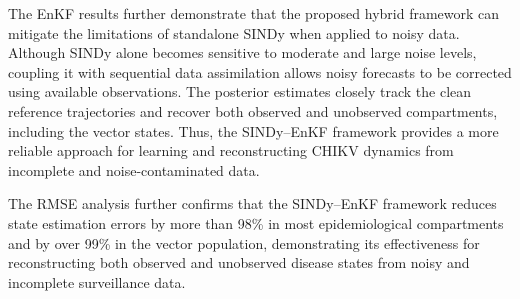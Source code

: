 \documentclass[9pt]{article}
\numberwithin{equation}{section}
\begin{document}
The EnKF results further demonstrate that the proposed hybrid framework can mitigate the limitations of standalone SINDy when applied to noisy data. Although SINDy alone becomes sensitive to moderate and large noise levels, coupling it with sequential data assimilation allows noisy forecasts to be corrected using available observations. The posterior estimates closely track the clean reference trajectories and recover both observed and unobserved compartments, including the vector states. Thus, the SINDy--EnKF framework provides a more reliable approach for learning and reconstructing CHIKV dynamics from incomplete and noise-contaminated data.

The RMSE analysis further confirms that the SINDy--EnKF framework reduces state estimation errors by more than 98\% in most epidemiological compartments and by over 99\% in the vector population, demonstrating its effectiveness for reconstructing both observed and unobserved disease states from noisy and incomplete surveillance data.
\end{document}
